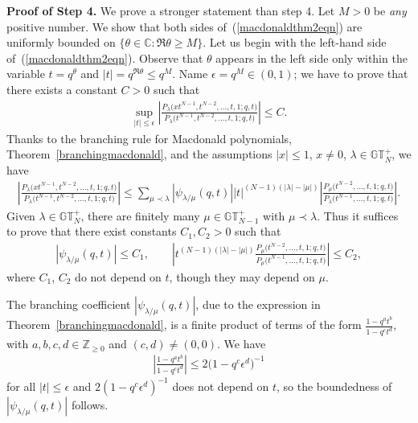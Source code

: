 \documentclass[pdftex]{sigma}
\numberwithin{equation}{section}
\newcommand{\C}{\mathbb{C}}
\newcommand{\Z}{\mathbb{Z}}
\newcommand{\GTp}{\mathbb{GT}^+}
\begin{document}
\textbf{Proof of Step 4.} We prove a stronger statement than step 4. Let $M > 0$ be \textit{any} positive number. We show that both sides of~(\ref{macdonaldthm2eqn}) are uniformly bounded on $\{\theta\in\C\colon \Re\theta \geq M\}$. Let us begin with the left-hand side of~(\ref{macdonaldthm2eqn}). Observe that $\theta$ appears in the left side only within the variable $t = q^{\theta}$ and $|t| = q^{\Re\theta} \leq q^M$. Name $\epsilon = q^M\in (0, 1)$; we have to prove that there exists a constant $C > 0$ such that
\begin{gather*}
\sup_{|t| \leq \epsilon}{\left| \frac{P_{\lambda}\big(xt^{N-1}, t^{N-2}, \dots, t, 1; q, t\big)}{P_{\lambda}\big(t^{N-1}, t^{N-2}, \dots, t, 1; q, t\big)} \right|} \leq C.
\end{gather*}
Thanks to the branching rule for Macdonald polynomials, Theorem~\ref{branchingmacdonald}, and the assumptions $|x|\leq 1$, $x \neq 0$, $\lambda\in\GTp_N$, we have
\begin{gather*}
\left| \frac{P_{\lambda}\big(xt^{N-1}, t^{N-2}, \dots, t, 1; q, t\big)}{P_{\lambda}\big(t^{N-1}, t^{N-2}, \dots, t, 1; q, t\big)} \right| \leq \sum_{\mu\prec\lambda}{|\psi_{\lambda/\mu}(q, t)| |t|^{(N-1)(|\lambda| - |\mu|)} \left| \frac{P_{\mu}\big(t^{N-2}, \dots, t, 1; q, t\big)}{P_{\lambda}\big(t^{N-1}, \dots, t, 1; q, t\big)} \right| }.
\end{gather*}
Given $\lambda\in\GTp_N$, there are f\/initely many $\mu\in\GTp_{N-1}$ with $\mu\prec\lambda$. Thus it suf\/f\/ices to prove that there exist constants $C_1, C_2 > 0$ such that
\begin{gather*}
|\psi_{\lambda/\mu}(q, t)| \leq C_1, \qquad \left| t^{(N-1)(|\lambda| - |\mu|)}\frac{P_{\mu}\big(t^{N-2}, \dots, t, 1; q, t\big)}{P_{\mu}\big(t^{N-1}, \dots, t, 1; q, t\big)} \right| \leq C_2,
\end{gather*}
where $C_1$, $C_2$ do not depend on $t$, though they may depend on $\mu$.

The branching coef\/f\/icient $|\psi_{\lambda/\mu}(q, t)|$, due to the expression in Theorem~\ref{branchingmacdonald}, is a f\/inite product of terms of the form $\frac{1 - q^at^b}{1 - q^ct^d}$, with $a, b, c, d\in\Z_{\geq 0}$ and $(c, d)\neq (0, 0)$. We have{\samepage
\begin{gather*}
\left| \frac{1 - q^at^b}{1 - q^ct^d} \right| \leq 2\big(1 - q^c\epsilon^d\big)^{-1}
\end{gather*}
for all $|t|\leq\epsilon$ and $2(1 - q^c\epsilon^d)^{-1}$ does not depend on $t$, so the boundedness of $|\psi_{\lambda/\mu}(q, t)|$ follows.}
\end{document}
